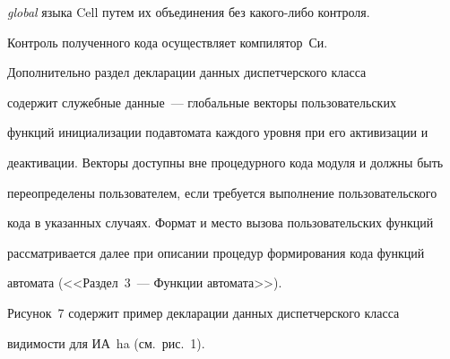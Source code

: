 \textit{global} языка Cell путем их объединения без какого-либо контроля. 


Контроль полученного кода осуществляет компилятор~Си.


      


      Дополнительно раздел декларации данных диспетчерского класса 


содержит служебные данные~--- глобальные векторы пользовательских 


функций инициализации подавтомата каждого уровня при его активизации и 


деактивации. Векторы доступны вне процедурного кода модуля и должны быть 


переопределены пользователем, если требуется выполнение пользовательского 


кода в указанных случаях. Формат и место вызова пользовательских функций 


рассматривается далее при описании процедур формирования кода функций 


автомата (<<Раздел~3~--- Функции автомата>>).


      


      Рисунок~7 содержит пример декларации данных диспетчерского класса 


видимости для ИА~ha (см.\ рис.~1).


      


